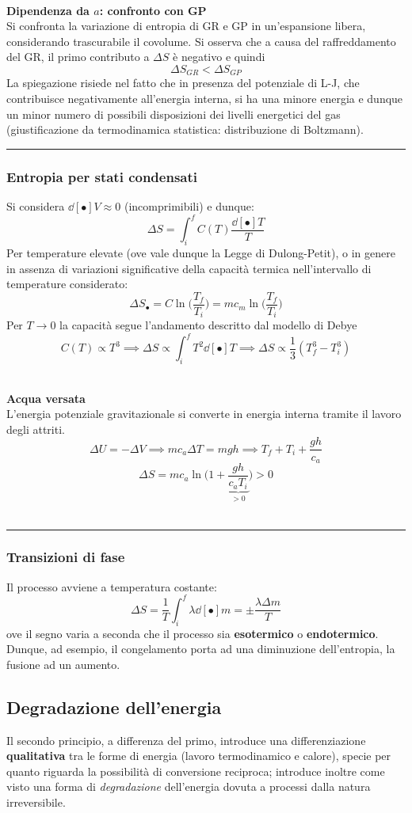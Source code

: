 \documentclass[10pt, oneside]{book}
\newcommand{\deltas}[1]{\Delta S_{#1}}
\newcommand{\infobox}[2]{\vspace{0.5cm}~\\ \textbf{#1} \hrulefill \vspace{0.2cm}\\#2 {}\,\\\hrule \vspace{0.5cm}}
\begin{document}
\infobox{Dipendenza da $a$: confronto con GP}{Si confronta la variazione di entropia di GR e GP in un'espansione libera, considerando trascurabile il covolume. Si osserva che a causa del raffreddamento del GR, il primo contributo a $\Delta S$ è negativo e quindi
\[\deltas{GR} < \deltas{GP}\]
La spiegazione risiede nel fatto che in presenza del potenziale di L-J, che contribuisce negativamente all'energia interna, si ha una minore energia e dunque un minor numero di possibili disposizioni dei livelli energetici del gas (giustificazione da termodinamica statistica: distribuzione di Boltzmann).
}

\subsubsection{Entropia per stati condensati}
Si considera $\dd[•]{V} \approx 0$ (incomprimibili) e dunque:
\[\Delta S = \int_i^f C(T) \frac{\dd[•]{T}}{T}\]
Per temperature elevate (ove vale dunque la Legge di Dulong-Petit), o in genere in assenza di variazioni significative della capacità termica nell'intervallo di temperature considerato:
\[\deltas{•} = C \ln \bigg( \frac{T_f}{T_i} \bigg) = m c_m \ln \bigg( \frac{T_f}{T_i} \bigg)\]
Per $T \rightarrow 0$ la capacità segue l'andamento descritto dal modello di Debye
\[C(T) \propto T^3 \implies \Delta S \propto \int_i^f T^2 \dd[•]{T} \implies \Delta S \propto \frac{1}{3} (T_f^3 - T_i^3)\]

\infobox{Acqua versata}{L'energia potenziale gravitazionale si converte in energia interna tramite il lavoro degli attriti. 
\[\Delta U = - \Delta V \implies m c_a \Delta T = mgh \implies T_f + T_i + \frac{gh}{c_a}\]
\[\Delta S = m c_a \ln \bigg( 1 + \underbrace{\frac{gh}{c_aT_i}}_{>0} \bigg) > 0\]
}

\subsubsection{Transizioni di fase}
Il processo avviene a temperatura costante:
\[\Delta S = \frac{1}{T}\int_i^f \lambda \dd[•]{m} = \pm \frac{\lambda \Delta m}{T}\]
ove il segno varia a seconda che il processo sia \textbf{esotermico} o \textbf{endotermico}.\\Dunque, ad esempio, il congelamento porta ad una diminuzione dell'entropia, la fusione ad un aumento.

\subsection{Degradazione dell'energia}
Il secondo principio, a differenza del primo, introduce una differenziazione \textbf{qualitativa} tra le forme di energia (lavoro termodinamico e calore), specie per quanto riguarda la possibilità di conversione reciproca; introduce inoltre come visto una forma di \textit{degradazione} dell'energia dovuta a processi dalla natura irreversibile.
\end{document}
